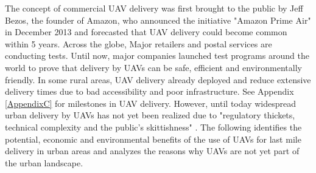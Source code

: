The concept of commercial UAV delivery was first brought to the public by Jeff Bezos, the founder of Amazon, 
who announced the initiative "Amazon Prime Air" \cite{AmazonPrimeAir} in December 2013
and forecasted that UAV delivery could become common within 5 years. \cite{Manjoo2016}
Across the globe, Major retailers and postal services are conducting tests.
Until now, major companies launched test programs around the world to prove 
that delivery by UAVs can be safe, efficient and environmentally friendly.
In some rural areas, UAV delivery already deployed and reduce extensive delivery times 
due to bad accessibility and poor infrastructure. \cite{McKinsey}
See Appendix \ref{AppendixC} for milestones in UAV delivery.
However, until today widespread urban delivery by UAVs has not yet been realized due to 
"regulatory thickets, technical complexity and the public’s skittishness" \cite{Rosen2019}.
The following identifies the potential, economic and environmental benefits of the use of UAVs for last mile delivery in urban areas 
and analyzes the reasons why UAVs are not yet part of the urban landscape.

